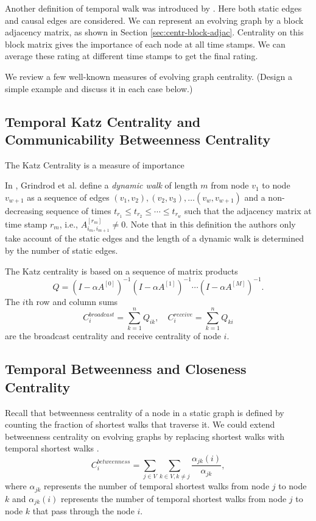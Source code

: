 \documentclass[12pt]{article}
\theoremstyle{definition}
\begin{document}
Another definition of temporal walk was introduced by \cite{chen16}. Here
both static edges and causal edges are considered. We can represent an evolving graph by a block adjacency matrix, as shown in Section \ref{sec:centr-block-adjac}. Centrality on this block matrix gives the importance of each node at all time stamps. We can average these rating at different time stamps to
get the final rating.


We review a few well-known measures of evolving graph centrality.
(Design a simple example and discuss it in each case below.)


\subsection{Temporal Katz Centrality and Communicability Betweenness Centrality}
\label{sec:temp-katz-centr}

The Katz Centrality is a measure of importance

In \cite{grindrod11}, Grindrod et al. define a \emph{dynamic walk} of length $m$ from
node $v_1$ to node $v_{w+1}$  as a sequence of edges
$(v_1, v_2), (v_2, v_3), \ldots (v_w, v_{w+1})$ and a non-decreasing sequence of times
$t_{r_1} \leq t_{r_2} \leq \cdots \leq t_{r_w}$ such that the adjacency matrix at time stamp
$r_m$, i.e., $A_{i_m, i_{m+1}}^{[r_m]} \ne 0$. Note that in this definition the authors only take account of the static edges and the length of a dynamic walk is determined by the number of static edges.

The Katz centrality is based on a sequence of matrix products
\begin{equation}
\label{eq:katz}
Q = (I - \alpha A^{[0]})^{-1}(I - \alpha A^{[1]})^{-1} \cdots (I - \alpha A^{[M]})^{-1}.
\end{equation}
The $i$th row and column sums
$$
C_i^{broadcast} = \sum_{k=1}^n Q_{ik}, \quad C_i^{receive} = \sum_{k=1}^n Q_{ki}
$$
are the broadcast centrality and receive centrality of node $i$.

\subsection{Temporal Betweenness and Closeness Centrality}
\label{sec:temp-betw-centr}

Recall that betweenness centrality of a node in a static graph is defined by counting the fraction of shortest walks that traverse it.
We could extend
betweenness centrality on evolving graphs by replacing shortest walks with temporal shortest walks \cite{nicosia13}.
\begin{equation}
  \label{eq:bet1}
C_i^{betweenness} = \sum_{j \in V}\sum_{k \in V, k \ne j}\frac{\alpha_{jk}(i)}{\alpha_{jk}},
\end{equation}
where $\alpha_{jk}$ represents the number of temporal shortest walks from node $j$ to node $k$ and $\alpha_{jk}(i)$ represents the number of temporal shortest walks from node $j$ to node $k$ that pass through the node $i$.
\end{document}
